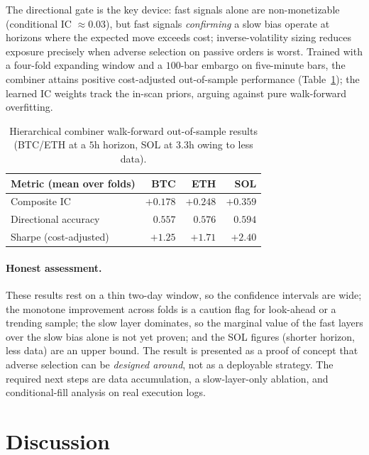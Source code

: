 \documentclass[11pt,a4paper]{article}
\theoremstyle{definition}
\theoremstyle{plain}
\begin{document}
The directional gate is the key device: fast signals alone are non-monetizable (conditional IC
$\approx 0.03$), but fast signals \emph{confirming} a slow bias operate at horizons where the
expected move exceeds cost; inverse-volatility sizing reduces exposure precisely when adverse
selection on passive orders is worst. Trained with a four-fold expanding window and a $100$-bar
embargo on five-minute bars, the combiner attains positive cost-adjusted out-of-sample
performance (Table~\ref{tab:combiner}); the learned IC weights track the in-scan priors, arguing
against pure walk-forward overfitting.

\begin{table}[ht]
\begin{center}
\small
\begin{tabular}{lrrr}
\hline
\textbf{Metric (mean over folds)} & \textbf{BTC} & \textbf{ETH} & \textbf{SOL} \\
\hline
Composite IC          & $+0.178$ & $+0.248$ & $+0.359$ \\
Directional accuracy  & $0.557$  & $0.576$  & $0.594$  \\
Sharpe (cost-adjusted)& $+1.25$  & $+1.71$  & $+2.40$  \\
\hline
\end{tabular}
\end{center}
\caption{Hierarchical combiner walk-forward out-of-sample results (BTC/ETH at a $5$h horizon, SOL
at $3.3$h owing to less data).}
\label{tab:combiner}
\end{table}

\paragraph{Honest assessment.}
These results rest on a thin two-day window, so the confidence intervals are wide; the monotone
improvement across folds is a caution flag for look-ahead or a trending sample; the slow layer
dominates, so the marginal value of the fast layers over the slow bias alone is not yet proven;
and the SOL figures (shorter horizon, less data) are an upper bound. The result is presented as a
proof of concept that adverse selection can be \emph{designed around}, not as a deployable
strategy. The required next steps are data accumulation, a slow-layer-only ablation, and
conditional-fill analysis on real execution logs.

\section{Discussion}
\label{sec:discussion}
\end{document}
